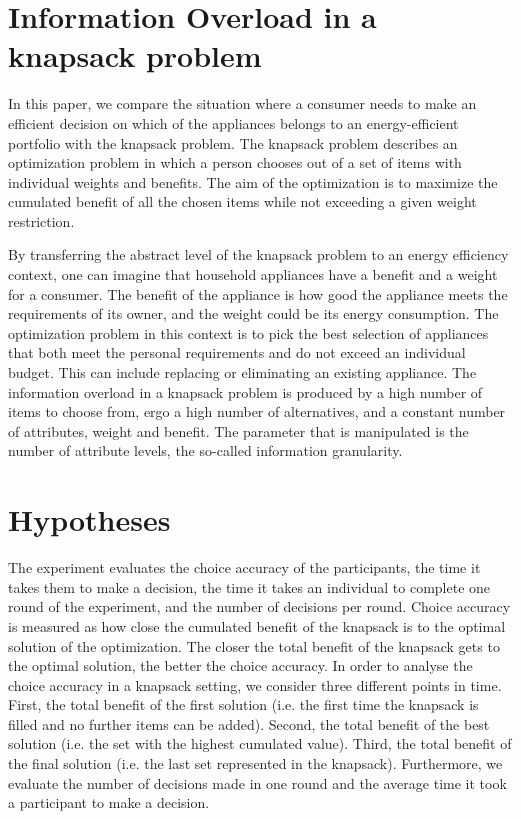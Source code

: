 \section{Information Overload in a knapsack problem}
\label{ch:Literature Review:sec:Information Overload in a knapsack problem}
In this paper, we compare the situation where a consumer needs to make an efficient decision on which of the appliances belongs to an energy-efficient portfolio with the knapsack problem. The knapsack problem describes an optimization problem in which a person chooses out of a set of items with individual weights and benefits. The aim of the optimization is to maximize the cumulated benefit of all the chosen items while not exceeding a given weight restriction.

By transferring the abstract level of the knapsack problem to an energy efficiency context, one can imagine that household appliances have a benefit and a weight for a consumer. The benefit of the appliance is how good the appliance meets the requirements of its owner, and the weight could be its energy consumption. The optimization problem in this context is to pick the best selection of appliances that both meet the personal requirements and do not exceed an individual budget. This can include replacing or eliminating an existing appliance.
The information overload in a knapsack problem is produced by a high number of items to choose from, ergo a high number of alternatives, and a constant number of attributes, weight and benefit. The parameter that is manipulated is the number of attribute levels, the so-called information granularity.

\section{Hypotheses}
\label{ch:Literature Review:sec:Hypotheses}
The experiment evaluates the choice accuracy of the participants, the time it takes them to make a decision, the time it takes an individual to complete one round of the experiment, and the number of decisions per round.
Choice accuracy is measured as how close the cumulated benefit of the knapsack is to the optimal solution of the optimization. The closer the total benefit of the knapsack gets to the optimal solution, the better the choice accuracy.
In order to analyse the choice accuracy in a knapsack setting, we consider three different points in time. First, the total benefit of the first solution (i.e. the first time the knapsack is filled and no further items can be added). Second, the total benefit of the best solution (i.e. the set with the highest cumulated value). Third, the total benefit of the final solution (i.e. the last set represented in the knapsack). Furthermore, we evaluate the number of decisions made in one round and the average time it took a participant to make a decision.


